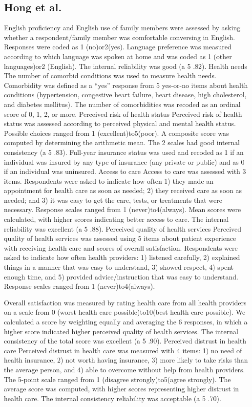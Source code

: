 \documentclass[../main.tex]{subfiles}
\begin{document}
\subsection{Hong et al.}
English proficiency and English use of family members were assessed by asking whether a respondent/family member was comfortable conversing in English. Responses were coded as 1 (no)or2(yes). Language preference was measured according to which language was spoken at home and was coded as 1 (other languages)or2 (English). The internal reliability was good (a 5 .82).
Health needs The number of comorbid conditions was used to measure health needs. Comorbidity was defined as a “yes” response from 5 yes-or-no items about health conditions (hypertension, congestive heart failure, heart disease, high cholesterol, and diabetes mellitus). The number of comorbidities was recoded as an ordinal score of 0, 1, 2, or more. Perceived risk of health status Perceived risk of health status was assessed according to perceived physical and mental health status. Possible choices ranged from 1 (excellent)to5(poor). A composite score was computed by determining the arithmetic mean. The 2 scales had good internal consistency (a 5 .83).
Full-year insurance status was used and recoded as 1 if an individual was insured by any type of insurance (any private or public) and as 0 if an individual was uninsured. Access to care Access to care was assessed with 3 items. Respondents were asked to indicate how often 1) they made an appointment for health care as soon as needed; 2) they received care as soon as needed; and 3) it was easy to get the care, tests, or treatments that were necessary. Response scales ranged from 1 (never)to4(always). Mean scores were calculated, with higher scores indicating better access to care. The internal reliability was excellent (a 5 .88). Perceived quality of health services Perceived quality of health services was assessed using 5 items about patient experience with receiving health care and scores of overall satisfaction. Respondents were asked to indicate how often health providers: 1) listened carefully, 2) explained things in a manner that was easy to understand, 3) showed respect, 4) spent enough time, and 5) provided advice/instruction that was easy to understand. Response scales ranged from 1 (never)to4(always).

Overall satisfaction was measured by rating health care from all health providers on a scale from 0 (worst health care possible)to10(best health care possible). We calculated a score by weighting equally and averaging the 6 responses, in which a higher score indicated higher perceived quality of health services. The internal consistency of the total score was excellent (a 5 .90). Perceived distrust in health care Perceived distrust in health care was measured with 4 items: 1) no need of health insurance, 2) not worth having insurance, 3) more likely to take risks than the average person, and 4) able to overcome without help from health providers. The 5-point scale ranged from 1 (disagree strongly)to5(agree strongly). The average score was computed, with higher scores representing higher distrust in health care. The internal consistency reliability was acceptable (a 5 .70).
\end{document}
